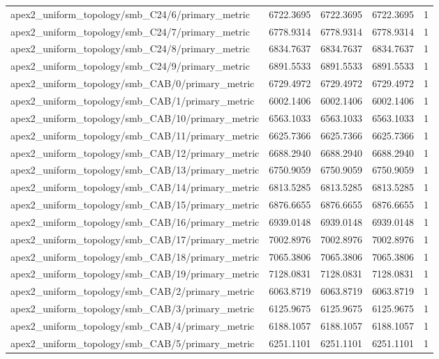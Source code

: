 \begin{table}[h]
\begin{tabular}{lrrrr}
apex2_uniform_topology/smb_C24/6/primary_metric & 6722.3695 & 6722.3695 & 6722.3695 & 1 \\
apex2_uniform_topology/smb_C24/7/primary_metric & 6778.9314 & 6778.9314 & 6778.9314 & 1 \\
apex2_uniform_topology/smb_C24/8/primary_metric & 6834.7637 & 6834.7637 & 6834.7637 & 1 \\
apex2_uniform_topology/smb_C24/9/primary_metric & 6891.5533 & 6891.5533 & 6891.5533 & 1 \\
apex2_uniform_topology/smb_CAB/0/primary_metric & 6729.4972 & 6729.4972 & 6729.4972 & 1 \\
apex2_uniform_topology/smb_CAB/1/primary_metric & 6002.1406 & 6002.1406 & 6002.1406 & 1 \\
apex2_uniform_topology/smb_CAB/10/primary_metric & 6563.1033 & 6563.1033 & 6563.1033 & 1 \\
apex2_uniform_topology/smb_CAB/11/primary_metric & 6625.7366 & 6625.7366 & 6625.7366 & 1 \\
apex2_uniform_topology/smb_CAB/12/primary_metric & 6688.2940 & 6688.2940 & 6688.2940 & 1 \\
apex2_uniform_topology/smb_CAB/13/primary_metric & 6750.9059 & 6750.9059 & 6750.9059 & 1 \\
apex2_uniform_topology/smb_CAB/14/primary_metric & 6813.5285 & 6813.5285 & 6813.5285 & 1 \\
apex2_uniform_topology/smb_CAB/15/primary_metric & 6876.6655 & 6876.6655 & 6876.6655 & 1 \\
apex2_uniform_topology/smb_CAB/16/primary_metric & 6939.0148 & 6939.0148 & 6939.0148 & 1 \\
apex2_uniform_topology/smb_CAB/17/primary_metric & 7002.8976 & 7002.8976 & 7002.8976 & 1 \\
apex2_uniform_topology/smb_CAB/18/primary_metric & 7065.3806 & 7065.3806 & 7065.3806 & 1 \\
apex2_uniform_topology/smb_CAB/19/primary_metric & 7128.0831 & 7128.0831 & 7128.0831 & 1 \\
apex2_uniform_topology/smb_CAB/2/primary_metric & 6063.8719 & 6063.8719 & 6063.8719 & 1 \\
apex2_uniform_topology/smb_CAB/3/primary_metric & 6125.9675 & 6125.9675 & 6125.9675 & 1 \\
apex2_uniform_topology/smb_CAB/4/primary_metric & 6188.1057 & 6188.1057 & 6188.1057 & 1 \\
apex2_uniform_topology/smb_CAB/5/primary_metric & 6251.1101 & 6251.1101 & 6251.1101 & 1 \\

\end{tabular}
\end{table}
